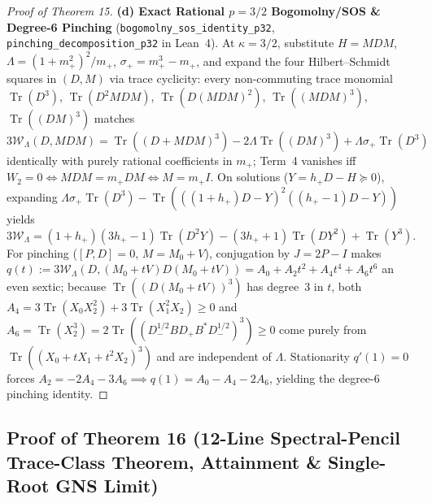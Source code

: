\documentclass[10pt,letterpaper]{article}
\newcommand{\Tr}{\operatorname{Tr}}
\begin{document}
\begin{proof}[Proof of Theorem 15]
\textbf{(d) Exact Rational $p = 3/2$ Bogomolny/SOS \& Degree-6 Pinching} (\texttt{bogomolny\_\allowbreak sos\_identity\_p32}, \texttt{pinching\_\allowbreak decomposition\_p32} in Lean~4).
At $\kappa = 3/2$, substitute $H = M D M$, $\Lambda = (1+m_+^2)^2/m_+$, $\sigma_+ = m_+^3 - m_+$, and expand the four Hilbert--Schmidt squares in $(D, M)$ via trace cyclicity: every non-commuting trace monomial $\Tr(D^3)$, $\Tr(D^2 M D M)$, $\Tr(D(MDM)^2)$, $\Tr((MDM)^3)$, $\Tr((DM)^3)$ matches $3\mathcal{W}_\Lambda(D, MDM) = \Tr((D+MDM)^3) - 2\Lambda\Tr((DM)^3) + \Lambda\sigma_+\Tr(D^3)$ identically with purely rational coefficients in $m_+$; Term~4 vanishes iff $W_2 = 0 \iff M D M = m_+ D M \iff M = m_+ I$. On solutions ($Y = h_+ D - H \succeq 0$), expanding $\Lambda\sigma_+\Tr(D^3) - \Tr(((1+h_+)D - Y)^2((h_+-1)D - Y))$ yields $3\mathcal{W}_\Lambda = (1+h_+)(3h_+-1)\Tr(D^2 Y) - (3h_+ + 1)\Tr(D Y^2) + \Tr(Y^3)$. For pinching ($[P, D] = 0$, $M = M_0 + V$), conjugation by $J = 2P - I$ makes $q(t) := 3\mathcal{W}_\Lambda(D, (M_0 + tV)D(M_0 + tV)) = A_0 + A_2 t^2 + A_4 t^4 + A_6 t^6$ an even sextic; because $\Tr((D(M_0 + tV))^3)$ has degree~$3$ in $t$, both $A_4 = 3\Tr(X_0 X_2^2) + 3\Tr(X_1^2 X_2) \ge 0$ and $A_6 = \Tr(X_2^3) = 2\Tr((D_-^{1/2} B D_+ B^* D_-^{1/2})^3) \ge 0$ come purely from $\Tr((X_0 + t X_1 + t^2 X_2)^3)$ and are independent of $\Lambda$. Stationarity $q'(1) = 0$ forces $A_2 = -2 A_4 - 3 A_6 \implies q(1) = A_0 - A_4 - 2 A_6$, yielding the degree-6 pinching identity.
\end{proof}

\subsection{Proof of Theorem 16 (12-Line Spectral-Pencil Trace-Class Theorem, Attainment \& Single-Root GNS Limit)}
\end{document}
